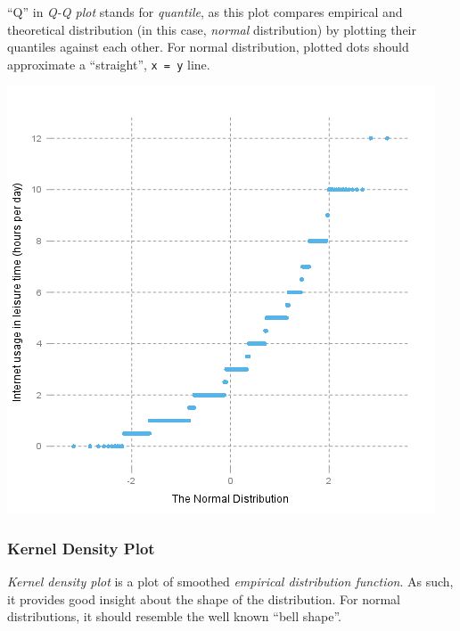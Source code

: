 \documentclass[]{article}
\makeatletter
\def\maxwidth{\ifdim\Gin@nat@width>\linewidth\linewidth
\else\Gin@nat@width\fi}
\let\Oldincludegraphics\includegraphics
\renewcommand{\includegraphics}[1]{\Oldincludegraphics[width=\maxwidth]{#1}}
\makeatother
\begin{document}
``Q'' in \emph{Q-Q plot} stands for \emph{quantile}, as this plot
compares empirical and theoretical distribution (in this case,
\emph{normal} distribution) by plotting their quantiles against each
other. For normal distribution, plotted dots should approximate a
``straight'', \texttt{x = y} line.

\href{95d42d4d0934008cfa630e1c4523e09a-hires.png}{\includegraphics{95d42d4d0934008cfa630e1c4523e09a.png}}

\subsubsection{Kernel Density Plot}

\emph{Kernel density plot} is a plot of smoothed \emph{empirical
distribution function}. As such, it provides good insight about the
shape of the distribution. For normal distributions, it should resemble
the well known ``bell shape''.
\end{document}
